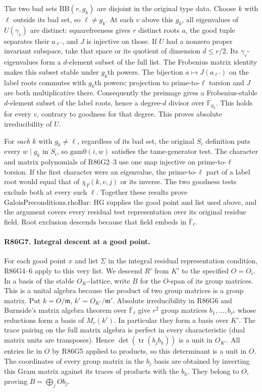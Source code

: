 The two bad sets $\mathrm{BB}(r,g_k)$ are disjoint in the
original type data. Choose $k$ with $\ell$ outside its bad set,
so $\ell\ne g_k$. At each $v$ above this $g_k$, all eigenvalues
of $U(\gamma_v)$ are distinct: squarefreeness gives $r$ distinct
roots $a$, the good tuple separates their $a_{\ell'}$, and $J$ is
injective on those. If $U$ had a nonzero proper invariant subspace,
take that space or its quotient of dimension $d\le r/2$.
Its $\gamma_v$-eigenvalues form a $d$-element subset of the
full list. The Frobenius matrix identity makes this subset stable
under $g_k$th powers. The bijection $a\mapsto J(a_{\ell'})$ on
the label roots commutes with $g_k$th powers; projection to
prime-to-$\ell$ torsion and $J$ are both multiplicative there.
Consequently the preimage gives a Frobenius-stable $d$-element
subset of the label roots, hence a degree-$d$ divisor over
$\mathbb F_{g_k}$. This holds for every $v$, contrary to goodness
for that degree. This proves absolute irreducibility of $U$.

For \emph{each} $k$ with $g_k\ne\ell$, regardless of its bad set,
the original $S_i$ definition puts every $w\mid g_k$ in $S_i$,
so $\mathrm{gam0}(i,w)$ satisfies the tame-generator test.
The character and matrix polynomials of R86G2--3 use one map
injective on prime-to-$\ell$ torsion. If the first character
were an eigenvalue, the prime-to-$\ell$ part of a label root
would equal that of $\chi_T(k,v,j)$ or its inverse. The two
goodness tests exclude both at every such $\ell$.
Together these results prove $\mathrm{GaloisPreconditions.rhoBar}$:
$\mathrm{HG}$ supplies the good point and list used above, and
the argument covers every residual test representation over its
original residue field. Root exclusion descends because that
field embeds in $\overline{\mathbb F}_\ell$.

\paragraph{R86G7. Integral descent at a good point.}
For each good point $x$ and list $\Sigma$ in the integral residual representation condition,
R86G4--6 apply to this very list. We descend $R'$ from $K'$ to
the specified $O=O_i$. In a basis of the stable $O_{K'}$-lattice,
write $B$ for the $O$-span of its group matrices. This is a
unital algebra because the product of two group matrices is a
group matrix. Put $k=O/\mathfrak m$, $k'=O_{K'}/\mathfrak m'$.
Absolute irreducibility in R86G6 and Burnside's matrix algebra
theorem over $\overline{\mathbb F}_\ell$ give $r^2$ group
matrices $b_1,\ldots,b_{r^2}$ whose reductions form a basis of
$M_r(k')$. In particular they form a basis over $K'$. The trace
pairing on the full matrix algebra is perfect in every
characteristic (dual matrix units are transposes). Hence
$\det(\operatorname{tr}(b_j b_h))$ is a unit in $O_{K'}$.
All entries lie in $O$ by R86G5 applied to products, so this
determinant is a unit in $O$. The coordinates of every group
matrix in the $b_j$ basis are obtained by inverting this Gram
matrix against its traces of products with the $b_h$. They
belong to $O$, proving $B=\bigoplus_j O b_j$.

